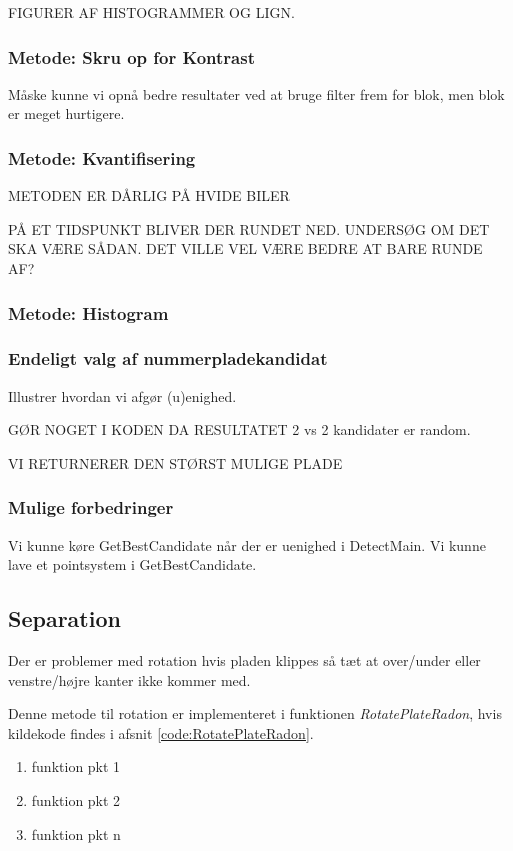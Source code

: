 FIGURER AF HISTOGRAMMER OG LIGN.


\subsubsection{Metode: Skru op for Kontrast}
Måske kunne vi opnå bedre resultater ved at bruge filter frem for blok, men blok er meget hurtigere.

\subsubsection{Metode: Kvantifisering}

METODEN ER DÅRLIG PÅ HVIDE BILER

PÅ ET TIDSPUNKT BLIVER DER RUNDET NED. UNDERSØG OM DET SKA VÆRE SÅDAN. DET VILLE VEL VÆRE BEDRE AT BARE RUNDE AF?


\subsubsection{Metode: Histogram}

\subsubsection{Endeligt valg af nummerpladekandidat}
Illustrer hvordan vi afgør (u)enighed. 

GØR NOGET I KODEN DA RESULTATET 2 vs 2 kandidater er random.

VI RETURNERER DEN STØRST MULIGE PLADE

\subsubsection{Mulige forbedringer}
Vi kunne køre GetBestCandidate når der er uenighed i DetectMain.
Vi kunne lave et pointsystem i GetBestCandidate.

\subsection{Separation}
\label{sec:implementation/sep/rotation}

Der er problemer med rotation hvis pladen klippes så tæt at over/under eller venstre/højre kanter ikke kommer med.

Denne metode til rotation er implementeret i funktionen \textit{RotatePlateRadon}, hvis kildekode findes i afsnit \vref{code:RotatePlateRadon}.

\begin{enumerate}
\item funktion pkt 1
\item funktion pkt 2
\item funktion pkt n
\end{enumerate}

